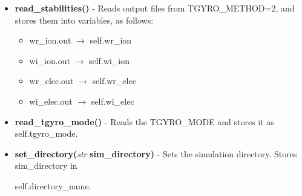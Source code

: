 \documentclass{article}
\begin{document}
\begin{itemize}
\begin{itemize}
\item \textbf{read\_stabilities()} - Reads output files from TGYRO\_METHOD=2, and stores them into variables, as follows:
\begin{itemize}
\item wr\_ion.out $\rightarrow$ self.wr\_ion
\item wi\_ion.out $\rightarrow$ self.wi\_ion
\item wr\_elec.out $\rightarrow$ self.wr\_elec
\item wi\_elec.out $\rightarrow$ self.wi\_elec
\end{itemize}
\item \textbf{read\_tgyro\_mode()} - Reads the TGYRO\_MODE and stores it as self.tgyro\_mode.
\item \textbf{set\_directory(}\emph{str}\textbf{ sim\_directory)} - Sets the simulation directory.  Stores sim\_directory in

self.directory\_name.
\end{itemize}
\end{itemize}
\end{document}
